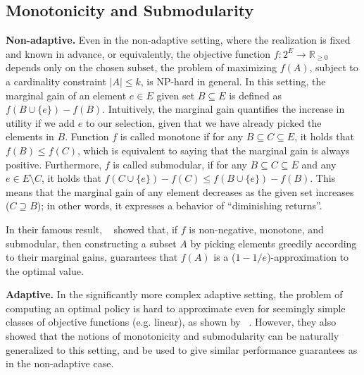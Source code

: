 \documentclass{article}
\newcommand{\citet}[1]{\citeauthor{#1}~\shortcite{#1}}
\renewcommand{\paragraph}[1]{\vspace{0.3em}\noindent\textbf{#1.}\makebox[0.5em]{}}
\begin{document}
\subsection{Monotonicity and Submodularity}
\paragraph{Non-adaptive}
Even in the non-adaptive setting, where the realization is fixed and known in advance, or equivalently, the objective function $f : 2^E \to \mathbb{R}_{\geq 0}$ depends only on the chosen subset, the problem of maximizing $f(A)$, subject to a cardinality constraint $|A| \leq k$, is NP-hard in general.
In this setting, the marginal gain of an element $e \in E$ given set $B \subseteq E$ is defined as $f(B \cup \{e\}) - f(B)$.
Intuitively, the marginal gain quantifies the increase in utility if we add $e$ to our selection, given that we have already picked the elements in $B$.
Function $f$ is called monotone if for any $B \subseteq C \subseteq E$, it holds that $f(B) \leq f(C)$, which is equivalent to saying that the marginal gain is always positive.
Furthermore, $f$ is called submodular, if for any $B \subseteq C \subseteq E$ and any $e \in E \setminus C$, it holds that $f(C \cup \{e\}) - f(C) \leq  f(B \cup \{e\}) - f(B)$.
This means that the marginal gain of any element decreases as the given set increases ($C \supseteq B$); in other words, it expresses a behavior of ``diminishing returns''.

In their famous result, \citet{nemhauser78} showed that, if $f$ is non-negative, monotone, and submodular, then constructing a subset $A$ by picking elements greedily according to their marginal gains, guarantees that $f(A)$ is a ($1 - 1/e$)-approximation to the optimal value.

\paragraph{Adaptive}
In the significantly more complex adaptive setting, the problem of computing an optimal policy is hard to approximate even for seemingly simple classes of objective functions (e.g. linear), as shown by \citet{golovin11}.
However, they also showed that the notions of monotonicity and submodularity can be naturally generalized to this setting, and be used to give similar performance guarantees as in the non-adaptive case.
\end{document}
